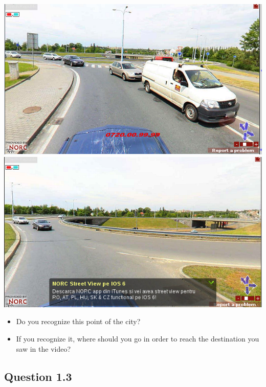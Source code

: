 \documentclass[12pt,a4paper,openright, notitlepage]{report}
\begin{document}
\includegraphics[width=\textwidth]{imgs/image-question12-1}
\includegraphics[width=\textwidth]{imgs/image-question12-2}

\begin{itemize}
	\item Do you recognize this point of the city?
	\item If you recognize it, where should you go in order to reach the destination you saw in the video?
\end{itemize}

\newpage

\subsection{Question 1.3}
\end{document}
